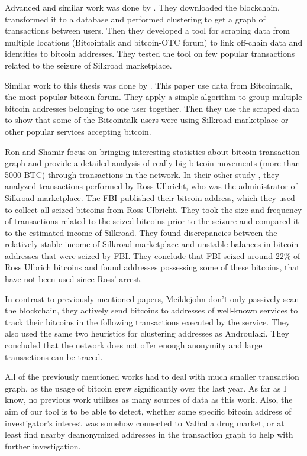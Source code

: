 \documentclass[
  digital, %
  table,   %
  lof,     %
  lot,     %
  oneside
]{fithesis3}
\begin{document}
Advanced and similar work was done by \parencite{spagnuolo2014bitiodine}. They downloaded the blockchain, transformed it to
 a database and performed clustering to get a graph of transactions between users.
Then they developed a tool for scraping data from multiple locations (Bitcointalk and bitcoin-OTC forum) to link
off-chain data and identities to bitcoin addresses.
They tested the tool on few popular transactions related to the seizure of Silkroad marketplace.

Similar work to this thesis was done by \parencite{fleder2015bitcoin}.
This paper use data from Bitcointalk, the most popular bitcoin forum. 
They apply a simple algorithm to group multiple bitcoin addresses belonging to one user together.
Then they use the scraped data to show
that some of the Bitcointalk users were using Silkroad marketplace or other popular services accepting bitcoin.
 
Ron and Shamir \parencite{ron2013quantitative} focus on bringing
interesting statistics about bitcoin transaction graph
and provide a detailed analysis of really big bitcoin movements (more than 5000 BTC) 
through transactions in the network.
In their other study \parencite{ron2014did}, they analyzed transactions performed by Ross Ulbricht,
who was the administrator of Silkroad marketplace.
The FBI published their bitcoin address, which they used to collect all seized bitcoins from Ross Ulbricht.
They took the size and frequency of transactions related to the seized bitcoins prior to the seizure and compared it to the estimated income of Silkroad. They found discrepancies between the 
relatively stable income of Silkroad marketplace and unstable balances in bitcoin addresses
that were seized by FBI. They conclude that FBI seized around 22\% of Ross Ulbrich bitcoins
and found addresses possessing some of these bitcoins, that have not been used since Ross' arrest.

In contrast to previously mentioned papers, Meiklejohn \parencite{meiklejohn2013fistful} 
don't only passively scan the blockchain, they actively send bitcoins to addresses of
well-known services to track their bitcoins in the following transactions executed by the service.
They also used the same two heuristics for clustering addresses
as Androulaki. \parencite{androulaki2013evaluating}
They concluded that the network does not offer enough anonymity and large transactions can be traced.

All of the previously mentioned works had to deal with much smaller transaction graph,
as the usage of bitcoin grew significantly over the last year. 
As far as I know,
no previous work utilizes as many sources of data as this work.
Also, the aim of our tool is to be able to detect, whether some specific bitcoin address of 
investigator's interest was somehow connected to Valhalla drug market, or at least find nearby
deanonymized addresses in the transaction graph to help with further investigation.
\end{document}
